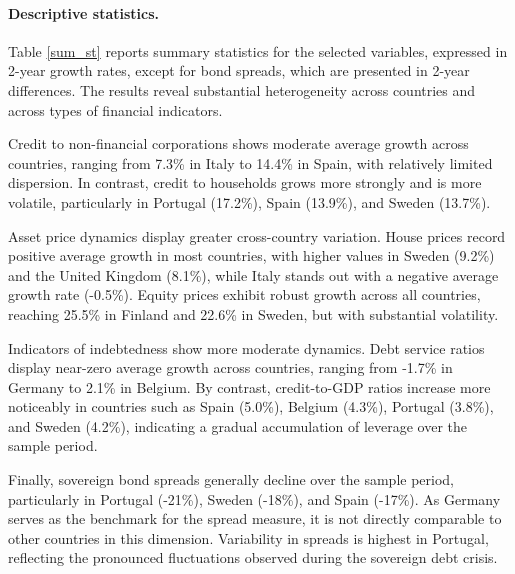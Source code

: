 \paragraph{Descriptive statistics.}  
  
Table \ref{sum_st} reports summary statistics for the selected variables, expressed in 2-year growth rates, except for bond spreads, which are presented in 2-year differences. The results reveal substantial heterogeneity across countries and across types of financial indicators.

Credit to non-financial corporations shows moderate average growth across countries, ranging from 7.3\% in Italy to 14.4\% in Spain, with relatively limited dispersion. In contrast, credit to households grows more strongly and is more volatile, particularly in Portugal (17.2\%), Spain (13.9\%), and Sweden (13.7\%).

Asset price dynamics display greater cross-country variation. House prices record positive average growth in most countries, with higher values in Sweden (9.2\%) and the United Kingdom (8.1\%), while Italy stands out with a negative average growth rate (-0.5\%). Equity prices exhibit robust growth across all countries, reaching 25.5\% in Finland and 22.6\% in Sweden, but with substantial volatility.

Indicators of indebtedness show more moderate dynamics. Debt service ratios display near-zero average growth across countries, ranging from -1.7\% in Germany to 2.1\% in Belgium. By contrast, credit-to-GDP ratios increase more noticeably in countries such as Spain (5.0\%), Belgium (4.3\%), Portugal (3.8\%), and Sweden (4.2\%), indicating a gradual accumulation of leverage over the sample period.

Finally, sovereign bond spreads generally decline over the sample period, particularly in Portugal (-21\%), Sweden (-18\%), and Spain (-17\%). As Germany serves as the benchmark for the spread measure, it is not directly comparable to other countries in this dimension. Variability in spreads is highest in Portugal, reflecting the pronounced fluctuations observed during the sovereign debt crisis.

